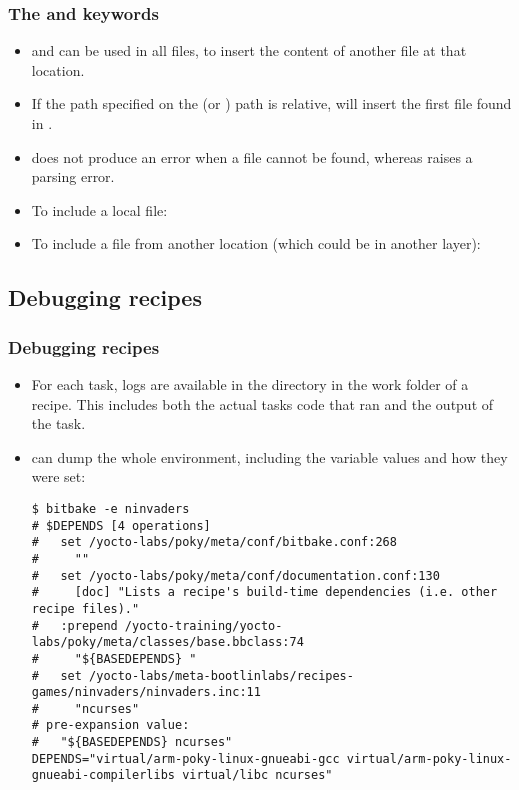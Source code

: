 \begin{frame}
  \frametitle{The  and  keywords}
  \begin{itemize}
    \item {} and  can be used in all files,
      to insert the content of another file at that location.
    \item If the path specified on the  (or
      ) path is relative,  will insert the first
      file found in .
    \item {} does not produce an error when a file cannot
      be found, whereas  raises a parsing error.
    \item To include a local file: 
    \item To include a file from another location (which could be
      in another layer): 
  \end{itemize}
\end{frame}

\subsection{Debugging recipes}

\begin{frame}[fragile]
  \frametitle{Debugging recipes}
  \begin{itemize}
    \item For each task, logs are available in the 
      directory in the work folder of a recipe. This includes both
      the actual tasks code that ran and the output of the task.
    \item {} can dump the whole environment, including the
      variable values and how they were set:
      \begin{block}{}
        \begin{verbatim}
$ bitbake -e ninvaders
# $DEPENDS [4 operations]
#   set /yocto-labs/poky/meta/conf/bitbake.conf:268
#     ""
#   set /yocto-labs/poky/meta/conf/documentation.conf:130
#     [doc] "Lists a recipe's build-time dependencies (i.e. other recipe files)."
#   :prepend /yocto-training/yocto-labs/poky/meta/classes/base.bbclass:74
#     "${BASEDEPENDS} "
#   set /yocto-labs/meta-bootlinlabs/recipes-games/ninvaders/ninvaders.inc:11
#     "ncurses"
# pre-expansion value:
#   "${BASEDEPENDS} ncurses"
DEPENDS="virtual/arm-poky-linux-gnueabi-gcc virtual/arm-poky-linux-gnueabi-compilerlibs virtual/libc ncurses"
        \end{verbatim}
      \end{block}

  \end{itemize}
\end{frame}


